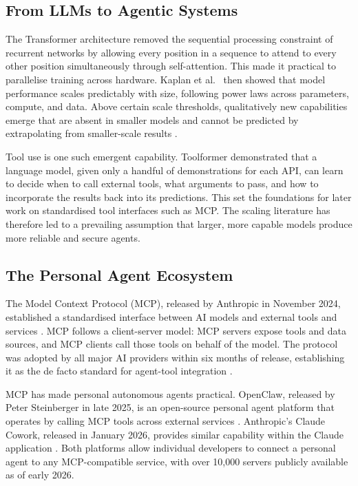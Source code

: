 \documentclass[conference]{IEEEtran}
\begin{document}
\subsection{From LLMs to Agentic Systems}

The Transformer architecture \cite{vaswani2017attention} removed the sequential processing
constraint of recurrent networks by allowing every position in a sequence to attend to
every other position simultaneously through self-attention. This made it practical to
parallelise training across hardware. Kaplan et al.\ \cite{kaplan2020scaling}
then showed that model performance scales predictably with size, following power laws
across parameters, compute, and data. Above certain scale thresholds, qualitatively new
capabilities emerge that are absent in smaller models and cannot be predicted by
extrapolating from smaller-scale results \cite{wei2022emergent}.

Tool use is one such emergent capability. Toolformer \cite{schick2023toolformer}
demonstrated that a language model, given only a handful of demonstrations for each API,
can learn to decide when to call external tools, what arguments to pass, and how to
incorporate the results back into its predictions. This set the foundations for later work
on standardised tool interfaces such as MCP. The scaling literature has therefore led to a
prevailing assumption that larger, more capable models produce more reliable and secure
agents.

\subsection{The Personal Agent Ecosystem}

The Model Context Protocol (MCP), released by Anthropic in November 2024, established a
standardised interface between AI models and external tools and services
\cite{anthropic_mcp_2024}. MCP follows a client-server model: MCP servers expose tools
and data sources, and MCP clients call those tools on behalf of the model. The protocol
was adopted by all major AI providers within six months of release, establishing it as
the de facto standard for agent-tool integration \cite{anthropic_mcp_foundation_2025}.

MCP has made personal autonomous agents practical. OpenClaw, released by Peter Steinberger
in late 2025, is an open-source personal agent platform that operates by calling MCP tools
across external services \cite{openclaw_2025}. Anthropic's Claude Cowork, released in
January 2026, provides similar capability within the Claude application
\cite{anthropic_cowork_2026}. Both platforms allow individual developers to connect a
personal agent to any MCP-compatible service, with over 10,000 servers publicly available
as of early 2026.
\end{document}

